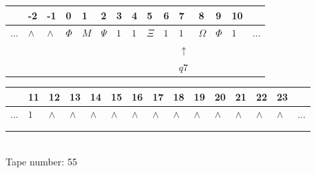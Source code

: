 \documentclass[11pt]{article}
\begin{document}
\begin{table}[H]
\centering
\begin{tabular}{lllllllllllllll}
 & -2 & -1 & 0 & 1 & 2 & 3 & 4 & 5 & 6 & 7 & 8 & 9 & 10 & \\
\hline
$...$ & \multicolumn{1}{|l|}{$\wedge$} & \multicolumn{1}{|l|}{$\wedge$} & \multicolumn{1}{|l|}{$\Phi$} & \multicolumn{1}{|l|}{$M$} & \multicolumn{1}{|l|}{$\Psi$} & \multicolumn{1}{|l|}{$1$} & \multicolumn{1}{|l|}{$1$} & \multicolumn{1}{|l|}{$\Xi$} & \multicolumn{1}{|l|}{$1$} & \multicolumn{1}{|l|}{$1$} & \multicolumn{1}{|l|}{$\Omega$} & \multicolumn{1}{|l|}{$\Phi$} & \multicolumn{1}{|l|}{$1$} & $...$\\
\hline
&  &  &  &  &  &  &  &  &  & $\uparrow$ &  &  &  &  \\
&  &  &  &  &  &  &  &  &  & $ q7 $ &  &  &  &  \\
\end{tabular}
\begin{tabular}{lllllllllllllll}
 & 11 & 12 & 13 & 14 & 15 & 16 & 17 & 18 & 19 & 20 & 21 & 22 & 23 & \\
\hline
$...$ & \multicolumn{1}{|l|}{$1$} & \multicolumn{1}{|l|}{$\wedge$} & \multicolumn{1}{|l|}{$\wedge$} & \multicolumn{1}{|l|}{$\wedge$} & \multicolumn{1}{|l|}{$\wedge$} & \multicolumn{1}{|l|}{$\wedge$} & \multicolumn{1}{|l|}{$\wedge$} & \multicolumn{1}{|l|}{$\wedge$} & \multicolumn{1}{|l|}{$\wedge$} & \multicolumn{1}{|l|}{$\wedge$} & \multicolumn{1}{|l|}{$\wedge$} & \multicolumn{1}{|l|}{$\wedge$} & \multicolumn{1}{|l|}{$\wedge$} & $...$\\
\hline
&  &  &  &  &  &  &  &  &  &  &  &  &  &  \\
&  &  &  &  &  &  &  &  &  &  &  &  &  &  \\
\end{tabular}
\\
Tape number: 55
\noindent\makebox[\linewidth]{\hdashrule{\textwidth}{1pt}{1pt}}\end{table}
\clearpage
\end{document}
